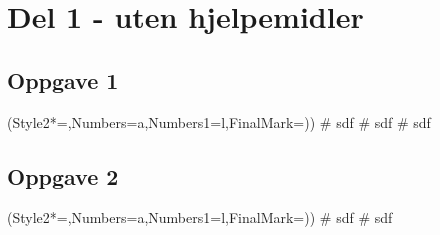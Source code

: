 


\newcommand{\fagkode}{R1}
\newcommand{\semesteraar}{høsten 2018}
\newcommand{\forfatter}{Tommy O.}
\newcommand{\dokumenttittel}{Løsningsforslag -- Eksamen \fagkode, \semesteraar}

\usepackage{siunitx}


\newcommand{\logonavn}{}






\section*{Del 1 - uten hjelpemidler}
\subsection*{Oppgave 1}
\begin{easylist}[enumerate]
	\ListProperties(Style2*=,Numbers=a,Numbers1=l,FinalMark={)})
	# sdf
	# sdf
	# sdf
\end{easylist}


\subsection*{Oppgave 2}
\begin{easylist}[enumerate]
	\ListProperties(Style2*=,Numbers=a,Numbers1=l,FinalMark={)})
	# sdf
	# sdf
\end{easylist}

